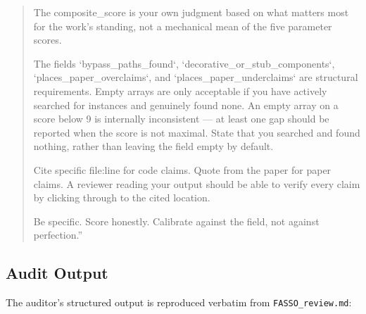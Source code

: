 \documentclass[11pt]{article}
\begin{document}
\begin{quote}
The composite\_score is your own judgment based on what matters most
for the work's standing, not a mechanical mean of the five parameter
scores.

The fields `bypass\_paths\_found`, `decorative\_or\_stub\_components`,
`places\_paper\_overclaims`, and `places\_paper\_underclaims` are
structural requirements. Empty arrays are only acceptable if you have
actively searched for instances and genuinely found none. An empty
array on a score below 9 is internally inconsistent — at least one
gap should be reported when the score is not maximal. State that you
searched and found nothing, rather than leaving the field empty by
default.

Cite specific file:line for code claims. Quote from the paper for
paper claims. A reviewer reading your output should be able to verify
every claim by clicking through to the cited location.

Be specific. Score honestly. Calibrate against the field, not against
perfection.''
\end{quote}


\subsection{Audit Output}

The auditor's structured output is reproduced verbatim from
\texttt{FASSO\_review.md}:
\end{document}
